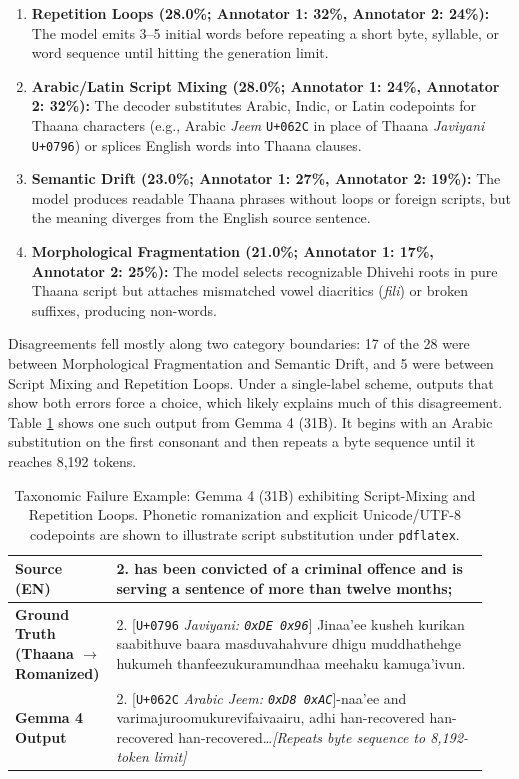 \documentclass[acmsmall,review,anonymous]{acmart}
\begin{document}
\begin{enumerate}
    \item \textbf{Repetition Loops (28.0\%; Annotator 1: 32\%, Annotator 2: 24\%):} The model emits 3--5 initial words before repeating a short byte, syllable, or word sequence until hitting the generation limit.
    \item \textbf{Arabic/Latin Script Mixing (28.0\%; Annotator 1: 24\%, Annotator 2: 32\%):} The decoder substitutes Arabic, Indic, or Latin codepoints for Thaana characters (e.g., Arabic \textit{Jeem} \texttt{U+062C} in place of Thaana \textit{Javiyani} \texttt{U+0796}) or splices English words into Thaana clauses.
    \item \textbf{Semantic Drift (23.0\%; Annotator 1: 27\%, Annotator 2: 19\%):} The model produces readable Thaana phrases without loops or foreign scripts, but the meaning diverges from the English source sentence.
    \item \textbf{Morphological Fragmentation (21.0\%; Annotator 1: 17\%, Annotator 2: 25\%):} The model selects recognizable Dhivehi roots in pure Thaana script but attaches mismatched vowel diacritics (\textit{fili}) or broken suffixes, producing non-words.
\end{enumerate}

Disagreements fell mostly along two category boundaries: 17 of the 28 were between Morphological Fragmentation and Semantic Drift, and 5 were between Script Mixing and Repetition Loops. Under a single-label scheme, outputs that show both errors force a choice, which likely explains much of this disagreement. Table \ref{tab:error} shows one such output from Gemma 4 (31B). It begins with an Arabic substitution on the first consonant and then repeats a byte sequence until it reaches 8,192 tokens.

\begin{table}[t]
\centering
\caption{Taxonomic Failure Example: Gemma 4 (31B) exhibiting Script-Mixing and Repetition Loops. Phonetic romanization and explicit Unicode/UTF-8 codepoints are shown to illustrate script substitution under \texttt{pdflatex}.}
\label{tab:error}
\begin{tabular}{p{0.18\linewidth} p{0.76\linewidth}}
\toprule
\textbf{Source (EN)} & 2. has been convicted of a criminal offence and is serving a sentence of more than twelve months; \\
\midrule
\textbf{Ground Truth (Thaana $\rightarrow$ Romanized)} & 2. [\texttt{U+0796} \textit{Javiyani: \texttt{0xDE 0x96}}] Jinaa'ee kusheh kurikan saabithuve baara masduvahahvure dhigu muddhathehge hukumeh thanfeezukuramundhaa meehaku kamuga'ivun. \\
\midrule
\textbf{Gemma 4 Output} & 2. [\texttt{U+062C} \textit{Arabic Jeem: \texttt{0xD8 0xAC}}]-naa'ee and varimajuroomukurevifaivaairu, adhi han-recovered han-recovered han-recovered\dots \textit{[Repeats byte sequence to 8,192-token limit]} \\
\bottomrule
\end{tabular}
\end{table}
\end{document}
